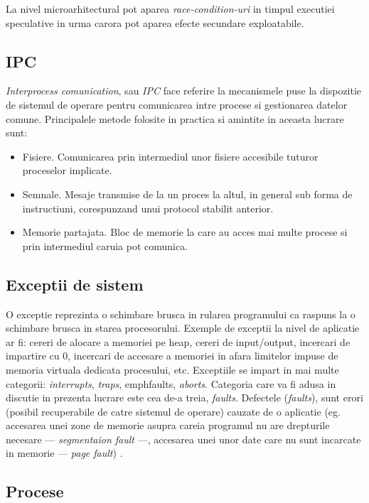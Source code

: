 La nivel microarhitectural pot aparea \emph{race-condition-uri} in timpul
executiei speculative in urma carora pot aparea efecte
secundare exploatabile.

\subsection{IPC} 

\emph{Interprocess comunication}, sau \emph{IPC} face referire la mecanismele
puse la dispozitie de sistemul de operare pentru comunicarea intre procese si
gestionarea datelor comune. Principalele metode folosite in practica si amintite in
aceasta lucrare sunt:
\begin{itemize}
  \setlength\itemsep{0em}
  \item Fisiere. Comunicarea prin intermediul unor fisiere accesibile tuturor
    proceselor implicate.
  \item Semnale. Mesaje transmise de la un proces la altul, in general sub
    forma de instructiuni, corespunzand unui protocol stabilit anterior.
  \item Memorie partajata. Bloc de memorie la care au acces mai multe procese
    si prin intermediul caruia pot comunica.
\end{itemize}

\subsection{Exceptii de sistem}

O exceptie reprezinta o schimbare brusca in rularea programului ca raspuns la o
schimbare brusca in starea procesorului. Exemple de exceptii la nivel de
aplicatie ar fi: cereri de alocare a memoriei pe heap, cereri de input/output,
incercari de impartire cu $0$, incercari de accesare a memoriei in afara
limitelor impuse de memoria virtuala dedicata procesului, etc. Exceptiile se
impart in mai multe categorii: \emph{interrupts}, \emph{traps}, emph{faults},
\emph{aborts}. Categoria care va fi adusa in discutie in prezenta lucrare este
cea de-a treia, \emph{faults}. Defectele (\emph{faults}), sunt erori (posibil
recuperabile de catre sistemul de operare) cauzate de o aplicatie (eg.
accesarea unei zone de memorie asupra careia programul nu are drepturile
necesare --- \emph{segmentaion fault} ---, accesarea unei unor date care nu
sunt incarcate in memorie --- \emph{page fault}) \cite{exception_processes}.

\subsection{Procese}

